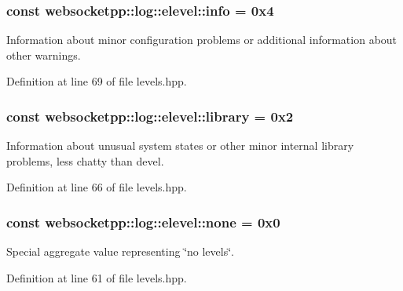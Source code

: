 \subsubsection[{info}]{ const websocketpp\+::log\+::elevel\+::info = 0x4\hspace{0.3cm}{\ttfamily [static]}}\label{structwebsocketpp_1_1log_1_1elevel_a3ab47987a682f0de7b1d0df8c9c3b9d2}
Information about minor configuration problems or additional information about other warnings. 

Definition at line 69 of file levels.\+hpp.

\hypertarget{structwebsocketpp_1_1log_1_1elevel_a2b862d4f143d9b77619ddbacd1763674}{}
\subsubsection[{library}]{ const websocketpp\+::log\+::elevel\+::library = 0x2\hspace{0.3cm}{\ttfamily [static]}}\label{structwebsocketpp_1_1log_1_1elevel_a2b862d4f143d9b77619ddbacd1763674}
Information about unusual system states or other minor internal library problems, less chatty than devel. 

Definition at line 66 of file levels.\+hpp.

\hypertarget{structwebsocketpp_1_1log_1_1elevel_ae86395aa26ec2089e07fd63b62a549fa}{}
\subsubsection[{none}]{ const websocketpp\+::log\+::elevel\+::none = 0x0\hspace{0.3cm}{\ttfamily [static]}}\label{structwebsocketpp_1_1log_1_1elevel_ae86395aa26ec2089e07fd63b62a549fa}


Special aggregate value representing \char`\"{}no levels\char`\"{}. 



Definition at line 61 of file levels.\+hpp.

\hypertarget{structwebsocketpp_1_1log_1_1elevel_ae8a9a9f8b1fa45a731acd340e10aa342}{}
